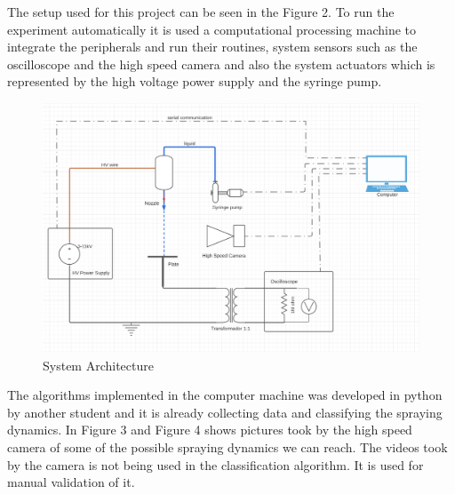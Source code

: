The setup used for this project can be seen in the Figure 2. To run the experiment automatically it is used a computational processing machine to integrate the peripherals and run their routines, system sensors such as the oscilloscope and the high speed camera 
and also the system actuators which is represented by the high voltage power supply and the syringe pump. 

\begin{figure}[H]
    \center
    \includegraphics[width=12cm]{images/images_folder_1/system_design.png}
    \caption{System Architecture}
\end{figure}

The algorithms implemented in the computer machine was developed in python by another student and it is already collecting data and classifying the spraying dynamics.
In Figure 3 and Figure 4 shows pictures took by the high speed camera of some of the possible spraying dynamics we can reach. The videos took by the camera is not being used in the classification
algorithm. It is used for manual validation of it.

